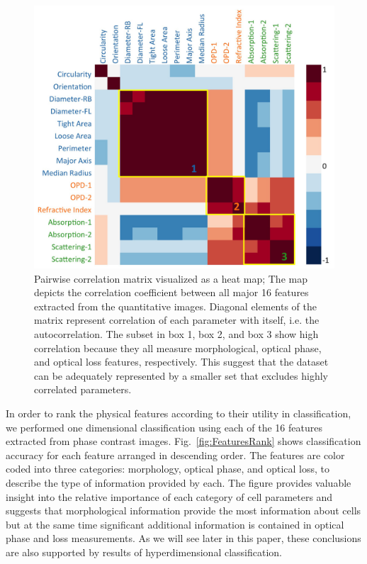 \documentclass[aps,pra,reprint,superscriptaddress]{revtex4-1}
\begin{document}
\begin{figure}
\includegraphics[scale=0.2]{FigureCorrelation.jpg}
\caption{\label{fig:Correlation} Pairwise correlation matrix visualized as a heat map; The map depicts the correlation coefficient between all major 16 features extracted from the quantitative images. Diagonal elements of the matrix represent correlation of each parameter with itself, i.e. the autocorrelation. The subset in box 1, box 2, and box 3 show high correlation because they all measure morphological, optical phase, and optical loss features, respectively. This suggest that the dataset can be adequately represented by a smaller set that excludes highly correlated parameters.}
\end{figure}

In order to rank the physical features according to their utility in classification, we performed one dimensional classification using each of the 16 features extracted from phase contrast images. Fig.~\ref{fig:FeaturesRank} shows classification accuracy for each feature arranged in descending order. The features are color coded into three categories: morphology, optical phase, and optical loss, to describe the type of information provided by each. The figure provides valuable insight into the relative importance of each category of cell parameters and suggests that morphological information provide the most information about cells but at the same time significant additional information is contained in optical phase and loss measurements. As we will see later in this paper, these conclusions are also supported by results of hyperdimensional classification.
\end{document}
